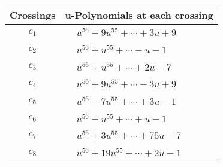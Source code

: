 \documentclass[1p]{elsarticle_modified}
\theoremstyle{definition}
\begin{document}
\begin{tabular}{m{50pt}|m{274pt}}
Crossings & \hspace{64pt}u-Polynomials at each crossing \\
\hline $$\begin{aligned}c_{1}\end{aligned}$$&$\begin{aligned}
&u^{56}-9 u^{55}+\cdots+3 u+9
\end{aligned}$\\
\hline $$\begin{aligned}c_{2}\end{aligned}$$&$\begin{aligned}
&u^{56}+u^{55}+\cdots- u-1
\end{aligned}$\\
\hline $$\begin{aligned}c_{3}\end{aligned}$$&$\begin{aligned}
&u^{56}+u^{55}+\cdots+2 u-7
\end{aligned}$\\
\hline $$\begin{aligned}c_{4}\end{aligned}$$&$\begin{aligned}
&u^{56}+9 u^{55}+\cdots-3 u+9
\end{aligned}$\\
\hline $$\begin{aligned}c_{5}\end{aligned}$$&$\begin{aligned}
&u^{56}-7 u^{55}+\cdots+3 u-1
\end{aligned}$\\
\hline $$\begin{aligned}c_{6}\end{aligned}$$&$\begin{aligned}
&u^{56}- u^{55}+\cdots+u-1
\end{aligned}$\\
\hline $$\begin{aligned}c_{7}\end{aligned}$$&$\begin{aligned}
&u^{56}+3 u^{55}+\cdots+75 u-7
\end{aligned}$\\
\hline $$\begin{aligned}c_{8}\end{aligned}$$&$\begin{aligned}
&u^{56}+19 u^{55}+\cdots+2 u-1
\end{aligned}$\\

\end{tabular}
\end{document}
